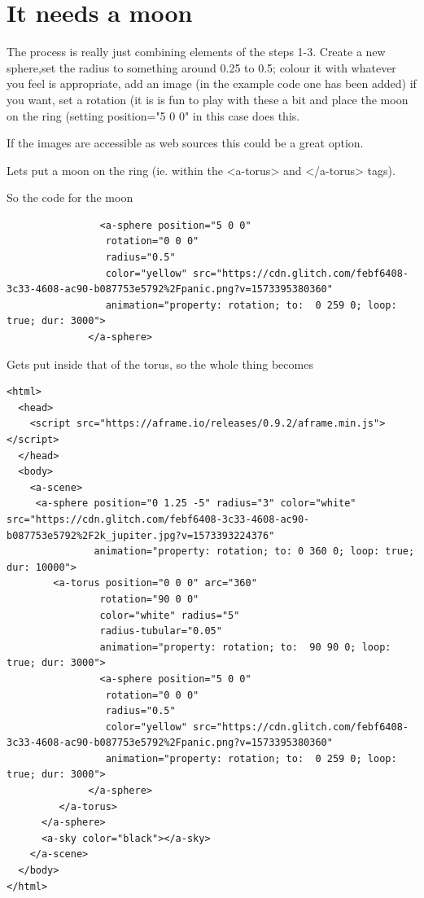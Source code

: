 \section{It needs a moon}
The process is really just combining elements of the steps 1-3. Create a new sphere,set the radius to something around 0.25 to 0.5; colour it with whatever you feel is appropriate, add an image (in the example code one has been added) if you want, set a rotation (it is is fun to play with these a bit and place the moon on the ring (setting position="5 0 0" in this case does this.

If the images are accessible as web sources this could be a great option.

Lets put a moon on the ring (ie. within the <a-torus> and </a-torus> tags).

So the code for the moon
\begin{lstlisting}
                <a-sphere position="5 0 0"
                 rotation="0 0 0"
                 radius="0.5"
                 color="yellow" src="https://cdn.glitch.com/febf6408-3c33-4608-ac90-b087753e5792%2Fpanic.png?v=1573395380360"
                 animation="property: rotation; to:  0 259 0; loop: true; dur: 3000">
              </a-sphere>
\end{lstlisting}
Gets put inside that of the torus, so the whole thing becomes
\begin{lstlisting}
<html>
  <head>
    <script src="https://aframe.io/releases/0.9.2/aframe.min.js"></script>
  </head>
  <body>
    <a-scene>
     <a-sphere position="0 1.25 -5" radius="3" color="white" src="https://cdn.glitch.com/febf6408-3c33-4608-ac90-b087753e5792%2F2k_jupiter.jpg?v=1573393224376"
               animation="property: rotation; to: 0 360 0; loop: true; dur: 10000">
        <a-torus position="0 0 0" arc="360"
                rotation="90 0 0"
                color="white" radius="5"
                radius-tubular="0.05"
                animation="property: rotation; to:  90 90 0; loop: true; dur: 3000">
                <a-sphere position="5 0 0"
                 rotation="0 0 0"
                 radius="0.5"
                 color="yellow" src="https://cdn.glitch.com/febf6408-3c33-4608-ac90-b087753e5792%2Fpanic.png?v=1573395380360"
                 animation="property: rotation; to:  0 259 0; loop: true; dur: 3000">
              </a-sphere>
         </a-torus>
      </a-sphere>   
      <a-sky color="black"></a-sky>
    </a-scene>
  </body>
</html>               
\end{lstlisting}

